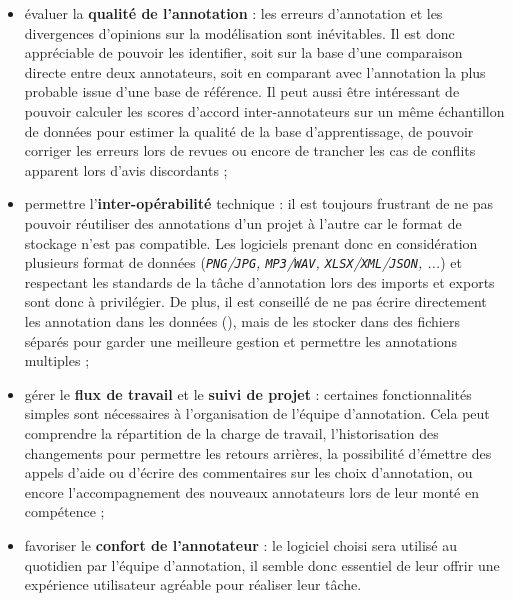 \begin{itemize}
			\item évaluer la \textbf{qualité de l'annotation} :
				les erreurs d'annotation et les divergences d'opinions sur la modélisation sont inévitables.
				Il est donc appréciable de pouvoir les identifier, soit sur la base d'une comparaison directe entre deux annotateurs, soit en comparant avec l'annotation la plus probable issue d'une base de référence.
				Il peut aussi être intéressant de pouvoir calculer les scores d'accord inter-annotateurs sur un même échantillon de données pour estimer la qualité de la base d'apprentissage, de pouvoir corriger les erreurs lors de revues ou encore de trancher les cas de conflits apparent lors d'avis discordants ;
			\item permettre l'\textbf{inter-opérabilité} technique :
				il est toujours frustrant de ne pas pouvoir réutiliser des annotations d'un projet à l'autre car le format de stockage n'est pas compatible.
				Les logiciels prenant donc en considération plusieurs format de données (\textit{\texttt{PNG}/\texttt{JPG}, \texttt{MP3}/\texttt{WAV}, \texttt{XLSX}/\texttt{XML}/\texttt{JSON}, ...}) et respectant les standards de la tâche d'annotation lors des imports et exports sont donc à privilégier.
				De plus, il est conseillé de ne pas écrire directement les annotation dans les données (), mais de les stocker dans des fichiers séparés pour garder une meilleure gestion et permettre les annotations multiples ;
			\item gérer le \textbf{flux de travail} et le \textbf{suivi de projet} :
				certaines fonctionnalités simples sont nécessaires à l'organisation de l'équipe d'annotation.
				Cela peut comprendre la répartition de la charge de travail, l'historisation des changements pour permettre les retours arrières, la possibilité d'émettre des appels d'aide ou d'écrire des commentaires sur les choix d'annotation, ou encore l'accompagnement des nouveaux annotateurs lors de leur monté en compétence ;
			\item favoriser le \textbf{confort de l'annotateur} :
				le logiciel choisi sera utilisé au quotidien par l'équipe d'annotation, il semble donc essentiel de leur offrir une expérience utilisateur agréable pour réaliser leur tâche.

\end{itemize}
